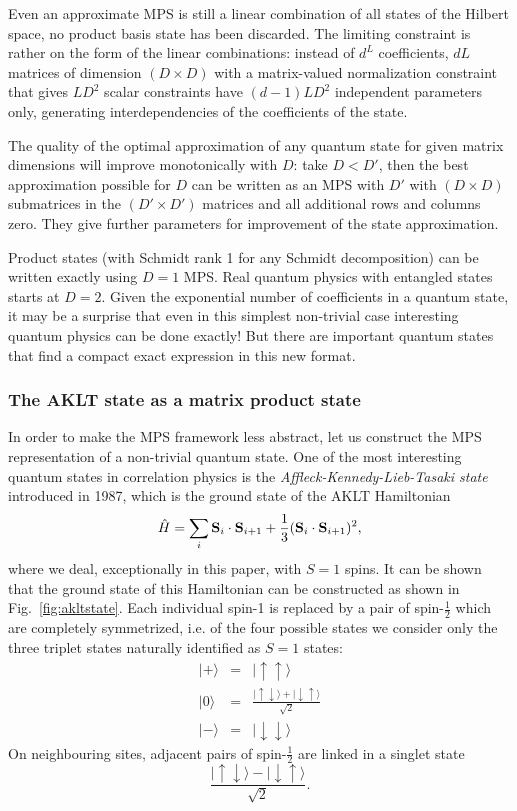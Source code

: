 \documentclass[a4paper,10pt,oneside,onecolumn,1p,times]{elsarticle}
\newcommand{\ham}{\hat{H}}                          %
\newcommand{\ket}[1]{\mbox{$| #1  \rangle$}}
\begin{document}
Even an approximate MPS is still a linear combination of all states of the Hilbert space, no product basis state has been discarded. The limiting constraint is rather on the form of the linear combinations: instead of $d^L$ coefficients, $dL$ matrices of dimension $(D\times D)$ with a matrix-valued normalization constraint that gives $LD^2$ scalar constraints have $(d-1)LD^2$ independent parameters only, generating interdependencies of the coefficients of the state.
 
The quality of the optimal approximation of any quantum state for given matrix dimensions will improve monotonically with $D$: take $D<D'$, then the best approximation possible for $D$ can be written as an MPS with $D'$ with $(D \times D)$ submatrices in the $(D' \times D')$ matrices and all additional rows and columns zero. They give further parameters for improvement of the state approximation.

Product states (with Schmidt rank 1 for any Schmidt decomposition) can be written exactly using $D=1$ MPS. Real quantum physics with entangled states starts at $D=2$. Given the exponential number of coefficients in a quantum state, it may be a surprise that even in this simplest non-trivial case interesting quantum physics can be done exactly! But there are important quantum states that find a compact exact expression in this new format.

\subsubsection{The AKLT state as a matrix product state} 
In order to make the MPS framework less abstract, let us construct the MPS representation of a non-trivial quantum state. One of the most interesting quantum states in correlation physics is the {\em Affleck-Kennedy-Lieb-Tasaki state} introduced in 1987, which is the ground state of  the AKLT Hamiltonian\cite{Affleck87,Affleck88}
\begin{equation}
\ham = \sum_{i} {\bf S}_i \cdot {\bf S}_{i+1} + 
\frac{1}{3} ({\bf S}_i \cdot {\bf S}_{i+1})^2 , 
\label{eq:aklt_hamiltonian}
\end{equation}
where we deal, exceptionally in this paper, with $S=1$ spins. It can be shown that the ground state of this Hamiltonian can be constructed as shown in Fig.~\ref{fig:akltstate}. Each individual spin-1 is replaced by a pair of spin-$\frac{1}{2}$ which are completely symmetrized, i.e. of the four possible states we consider only the three triplet states naturally identified as $S=1$ states:
\begin{eqnarray}
\ket{+}&=&\ket{\uparrow\uparrow} \nonumber \\
\ket{0}&=&\frac{\ket{\uparrow\downarrow}+\ket{\downarrow\uparrow}}{\sqrt{2}} 
\label{eq:tripletmapping} \\
\ket{-}&=&\ket{\downarrow\downarrow} \nonumber
\end{eqnarray}
On neighbouring sites, adjacent pairs of spin-$\frac{1}{2}$ are linked in a singlet state
\begin{equation}
\frac{\ket{\uparrow\downarrow}-\ket{\downarrow\uparrow}}{\sqrt{2}} .
\end{equation}
\end{document}
